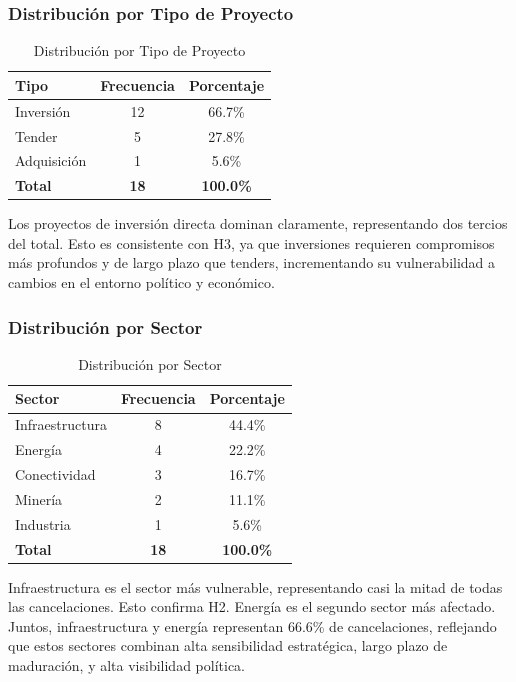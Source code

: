 \documentclass[12pt]{article}
\begin{document}
\subsubsection{Distribución por Tipo de Proyecto}

\begin{table}[H]
\centering
\caption{Distribución por Tipo de Proyecto}
\label{tab:tipo}
\begin{tabular}{lcc}
\toprule
\textbf{Tipo} & \textbf{Frecuencia} & \textbf{Porcentaje} \\
\midrule
Inversión & 12 & 66.7\% \\
Tender & 5 & 27.8\% \\
Adquisición & 1 & 5.6\% \\
\midrule
\textbf{Total} & \textbf{18} & \textbf{100.0\%} \\
\bottomrule
\end{tabular}
\end{table}

Los proyectos de inversión directa dominan claramente, representando dos tercios del total. Esto es consistente con H3, ya que inversiones requieren compromisos más profundos y de largo plazo que tenders, incrementando su vulnerabilidad a cambios en el entorno político y económico.

\subsubsection{Distribución por Sector}

\begin{table}[H]
\centering
\caption{Distribución por Sector}
\label{tab:sector}
\begin{tabular}{lcc}
\toprule
\textbf{Sector} & \textbf{Frecuencia} & \textbf{Porcentaje} \\
\midrule
Infraestructura & 8 & 44.4\% \\
Energía & 4 & 22.2\% \\
Conectividad & 3 & 16.7\% \\
Minería & 2 & 11.1\% \\
Industria & 1 & 5.6\% \\
\midrule
\textbf{Total} & \textbf{18} & \textbf{100.0\%} \\
\bottomrule
\end{tabular}
\end{table}

Infraestructura es el sector más vulnerable, representando casi la mitad de todas las cancelaciones. Esto confirma H2. Energía es el segundo sector más afectado. Juntos, infraestructura y energía representan 66.6\% de cancelaciones, reflejando que estos sectores combinan alta sensibilidad estratégica, largo plazo de maduración, y alta visibilidad política.
\end{document}
